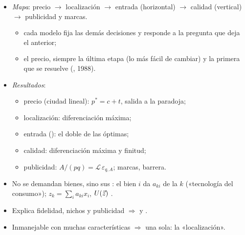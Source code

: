 \documentclass{article}
\begin{document}
\begin{columnas}
\begin{itemize}
\item \emph{Mapa}: precio $\to$ localización $\to$ entrada (horizontal) $\to$ calidad (vertical) $\to$ publicidad y marcas.
  \begin{itemize}
  \item cada modelo fija las demás decisiones y responde a la pregunta que deja el anterior;
  \item el precio, siempre la última etapa (lo más fácil de cambiar) y la primera que se resuelve (, 1988).
  \end{itemize}
\item \emph{Resultados}:
  \begin{itemize}
  \item precio (ciudad lineal): $p^*=c+t$, salida a la paradoja;
  \item localización: diferenciación máxima;
  \item entrada (): el doble de las óptimas;
  \item calidad: diferenciación máxima y finitud;
  \item publicidad: $A/(pq)=\mathcal{L}\,\varepsilon_{q,A}$; marcas, barrera.
  \end{itemize}
\end{itemize}
\begin{itemize}
\item No se demandan bienes, sino sus : el bien $i$ da $a_{ki}$ de la $k$ («tecnología del consumo»); $z_k=\sum_ia_{ki}x_i$, $U(\vec{z})$ .
\item Explica fidelidad, nichos y publicidad $\Rightarrow$  y .
\item Inmanejable con muchas características $\Rightarrow$ una sola: la «localización».
\end{itemize}


\end{columnas}
\end{document}
